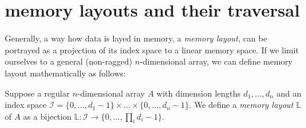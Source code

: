 \section{memory layouts and their traversal}





Generally, a way how data is layed in memory, a \emph{memory layout}, can be portrayed as a projection of its index space to a linear memory space. If we limit ourselves to a general (non-ragged) $n$-dimensional array, we can define memory layout mathematically as follows:

\begin{defn}
  Suppose a regular $n$-dimensional array $A$ with dimension lengths $d_1, \dots, d_n$ and an index space $\mathcal{I} = \{0,\dots,d_1 - 1\}\times \dots \times \{0,\dots,d_n - 1\}$. We define a \emph{memory layout} $\mathbb{L}$ of $A$ as a bijection $\mathbb{L}: \mathcal{I} \to \{0,\dots, \prod_{i}d_i - 1\}$. 
\end{defn}

